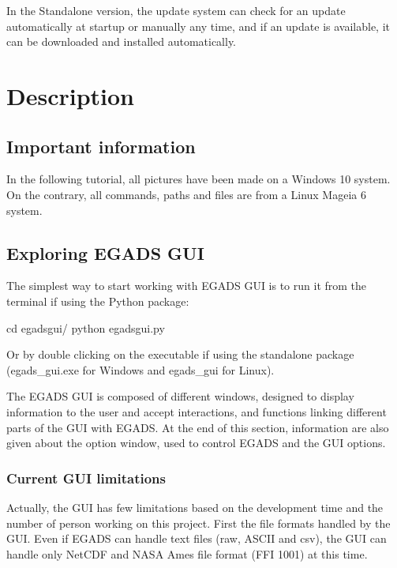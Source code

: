 \documentclass[a4paper,10pt,openany,english]{sphinxmanual}
\begin{document}
In the Stand\sphinxhyphen{}alone version, the update system can check for an update automatically at startup or manually any time, and if an update is available, it can be downloaded and installed automatically.


\chapter{Description}
\label{\detokenize{description:description}}\label{\detokenize{description::doc}}

\section{Important information}
\label{\detokenize{description:important-information}}
In the following tutorial, all pictures have been made on a Windows 10 system. On the contrary, all commands, paths and files are from a Linux Mageia 6 system.


\section{Exploring EGADS GUI}
\label{\detokenize{description:exploring-egads-gui}}
The simplest way to start working with EGADS GUI is to run it from the terminal if using the Python package:

\begin{sphinxVerbatim}[commandchars=\\\{\}]
\PYGZdl{} cd egads\PYGZus{}gui/
\PYGZdl{} python egads\PYGZus{}gui.py
\end{sphinxVerbatim}

Or by double clicking on the executable if using the stand\sphinxhyphen{}alone package (egads\_gui.exe for Windows and egads\_gui for Linux).

The EGADS GUI is composed of different windows, designed to display information to the user and accept interactions, and functions linking different parts of the GUI with EGADS. At the end of this section, information are also given about the option window, used to control EGADS and the GUI options.


\subsection{Current GUI limitations}
\label{\detokenize{description:current-gui-limitations}}
Actually, the GUI has few limitations based on the development time and the number of person working on this project. First the file formats handled by the GUI. Even if EGADS can handle text files (raw, ASCII and csv), the GUI can handle only NetCDF and NASA Ames file format (FFI 1001) at this time.
\end{document}
